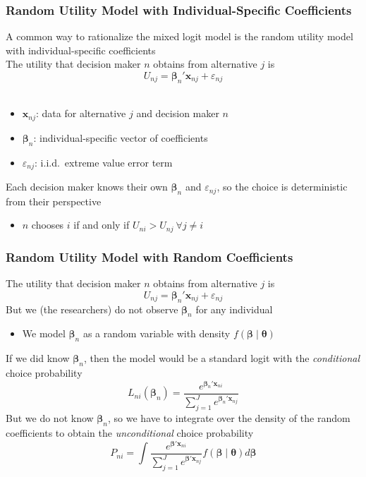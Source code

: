 \documentclass{beamer}
\begin{document}
\begin{frame}\frametitle{Random Utility Model with Individual-Specific Coefficients}
	A common way to rationalize the mixed logit model is the random utility model with individual-specific coefficients \\
	\vspace{3ex}
    The utility that decision maker $n$ obtains from alternative $j$ is
    $$U_{nj} = \bm{\beta}_n' \bm{x}_{nj} + \varepsilon_{nj}$$ \\
    \begin{itemize}
        \item $\bm{x}_{nj}$: data for alternative $j$ and decision maker $n$
        \item $\bm{\beta}_n$: individual-specific vector of coefficients
        \item $\varepsilon_{nj}$: i.i.d.\ extreme value error term
    \end{itemize}
    \vspace{3ex}
    Each decision maker knows their own $\bm{\beta}_n$ and $\varepsilon_{nj}$, so the choice is deterministic from their perspective
    \begin{itemize}
        \item $n$ chooses $i$ if and only if $U_{ni} > U_{nj} ~\forall j \neq i$
    \end{itemize}
\end{frame}

\begin{frame}\frametitle{Random Utility Model with Random Coefficients}
	The utility that decision maker $n$ obtains from alternative $j$ is
    $$U_{nj} = \bm{\beta}_n' \bm{x}_{nj} + \varepsilon_{nj}$$
    But we (the researchers) do not observe $\bm{\beta}_n$ for any individual
    \begin{itemize}
    	\item We model $\bm{\beta}_n$ as a random variable with density $f(\bm{\beta} \mid \bm{\theta})$
    \end{itemize}
    \vspace{2ex}
    If we did know $\bm{\beta}_n$, then the model would be a standard logit with the \emph{conditional} choice probability
    $$L_{ni}(\bm{\beta}_n) = \frac{e^{\bm{\beta}_n' \bm{x}_{ni}}}{\sum_{j = 1}^J e^{\bm{\beta}_n' \bm{x}_{nj}}}$$
    But we do not know $\bm{\beta}_n$, so we have to integrate over the density of the random coefficients to obtain the \emph{unconditional} choice probability
    $$P_{ni} = \int \frac{e^{\bm{\beta}' \bm{x}_{ni}}}{\sum_{j = 1}^J e^{\bm{\beta}' \bm{x}_{nj}}} f(\bm{\beta} \mid \bm{\theta}) d \bm{\beta}$$
\end{frame}
\end{document}
